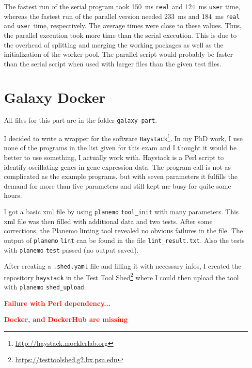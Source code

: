 \documentclass[paper=a4, 12pt]{scrartcl}
\newcommand{\xxx}[1]{\textbf{\textcolor{red}{#1}}}	%
\begin{document}
The fastest run of the serial program took 150~ms \texttt{real} and 124~ms \texttt{user} time, whereas the fastest run of the parallel version needed 233~ms and 184~ms \texttt{real} and \texttt{user} time, respectively. The average times were close to these values. Thus, the parallel execution took more time than the serial execution. This is due to the overhead of splitting and merging the working packages as well as the initialization of the worker pool. The parallel script would probably be faster than the serial script when used with larger files than the given test files.

\section{Galaxy Docker}

All files for this part are in the folder \texttt{galaxy-part}.

I decided to write a wrapper for the software \texttt{Haystack}\footnote{\url{http://haystack.mocklerlab.org}}. In my PhD work, I use none of the programs in the list given for this exam and I thought it would be better to use something, I actually work with. Haystack is a Perl script to identify oscillating genes in gene expression data. The program call is not as complicated as the example programs, but with seven parameters it fulfills the demand for more than five parameters and still kept me busy for quite some hours.

I got a basic xml file by using \texttt{planemo} \texttt{tool\_init} with many parameters. This xml file was then filled with additional data and two tests. After some corrections, the Planemo linting tool revealed no obvious failures in the file. The output of \texttt{planemo} \texttt{lint} can be found in the file \texttt{lint\_result.txt}. Also the tests with \texttt{planemo} \texttt{test} passed (no output saved).

After creating a \texttt{.shed.yaml} file and filling it with necessary infos, I created the repository \texttt{haystack} in the Test Tool Shed\footnote{\url{https://testtoolshed.g2.bx.psu.edu}} where I could then upload the tool with \texttt{planemo} \texttt{shed\_upload}.

\xxx{Failure with Perl dependency...}

\xxx{Docker, and DockerHub are missing}
\end{document}
